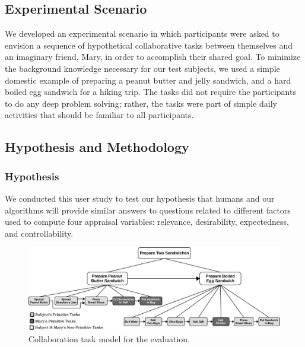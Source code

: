 \documentclass[12pt]{report}
\begin{document}
\subsection{Experimental Scenario}
We developed an experimental scenario in which participants were asked to
envision a sequence of hypothetical collaborative tasks between themselves and
an imaginary friend, Mary, in order to accomplish their shared goal. To minimize
the background knowledge necessary for our test subjects, we used a simple
domestic example of preparing a peanut butter and jelly sandwich, and a hard
boiled egg sandwich for a hiking trip. The tasks did not require the
participants to do any deep problem solving; rather, the tasks were part of
simple daily activities that should be familiar to all participants. 
% 
% 

\subsection{Hypothesis and Methodology}

\subsubsection{Hypothesis}
We conducted this user study to test our hypothesis that humans and our
algorithms will provide similar answers to questions related to different
factors used to compute four appraisal variables: relevance, desirability,
expectedness, and controllability.

\begin{figure}[t]
  \centering
  \includegraphics[width=1\textwidth]{figure/taskModel-croped.pdf}
  \caption{Collaboration task model for the evaluation.}
  \label{fig:taskModel}
\end{figure}
\end{document}

